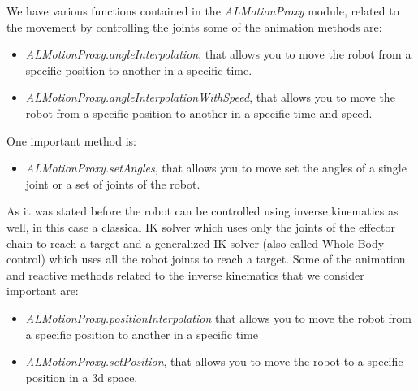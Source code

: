 \documentclass[conference]{IEEEtran}
\begin{document}
We have various functions contained in the \textit{ALMotionProxy} module, related to the movement by controlling the joints some of the animation methods are:
\begin{itemize}
    \item \textit{ALMotionProxy.angleInterpolation}, that allows you to move the robot from a specific position to another in a specific time.
    \item \textit{ALMotionProxy.angleInterpolationWithSpeed}, that allows you to move the robot from a specific position to another in a specific time and speed.
\end{itemize}
One important method is:
\begin{itemize}
    \item \textit{ALMotionProxy.setAngles}, that allows you to move set the angles of a single joint or a set of joints of the robot.
\end{itemize}

As it was stated before the robot can be controlled using inverse kinematics as well, in this case a classical IK solver which uses only the joints of the effector chain to reach a target and a generalized IK solver (also called Whole Body control) which uses all the robot joints to reach a target.
Some of the animation and reactive methods related to the inverse kinematics that we consider important are:
\begin{itemize}
    \item \textit{ALMotionProxy.positionInterpolation} that allows you to move the robot from a specific position to another in a specific time 
    \item \textit{ALMotionProxy.setPosition}, that allows you to move the robot to a specific position in a 3d space.
\end{itemize}
\end{document}
